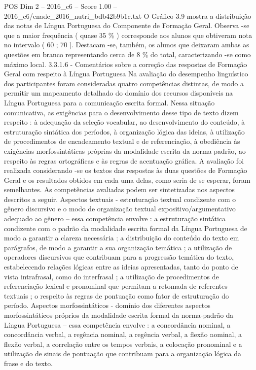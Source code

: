 \begin{textsample}{POS Dim 2 – 2016\_c6 – Score 1.00 – 2016\_c6/enade\_2016\_nutri\_bdb42b9b1c.txt}
O Gráfico 3.9 mostra a distribuição das notas de Língua Portuguesa do Componente de Formação Geral.
Observa -se que a maior frequência ( quase 35 \% ) corresponde aos alunos que obtiveram nota no intervalo ( 60 ; 70 ].
Destacam -se, também, os alunos que deixaram ambas as questões em branco representando cerca de 8 \% do total, caracterizando -se como máximo local. 3.3.1.6 - Comentários sobre a correção das respostas de Formação Geral com respeito à Língua Portuguesa Na avaliação do desempenho linguístico dos participantes foram consideradas quatro competências distintas, de modo a permitir um mapeamento detalhado do domínio dos recursos disponíveis na Língua Portuguesa para a comunicação escrita formal.
Nessa situação comunicativa, as exigências para o desenvolvimento desse tipo de texto dizem respeito : à adequação da seleção vocabular, ao desenvolvimento do conteúdo, à estruturação sintática dos períodos, à organização lógica das ideias, à utilização de procedimentos de encadeamento textual e de referenciação, à obediência às exigências morfossintáticas próprias da modalidade escrita da norma-padrão, ao respeito às regras ortográficas e às regras de acentuação gráfica.
A avaliação foi realizada considerando -se os textos das respostas às duas questões de Formação Geral e os resultados obtidos em cada uma delas, como seria de se esperar, foram semelhantes.
As competências avaliadas podem ser sintetizadas nos aspectos descritos a seguir.
Aspectos textuais - estruturação textual condizente com o gênero discursivo e o modo de organização textual expositivo/argumentativo adequado ao gênero – essa competência envolve : a estruturação sintática condizente com o padrão da modalidade escrita formal da Língua Portuguesa de modo a garantir a clareza necessária ; a distribuição do conteúdo do texto em parágrafos, de modo a garantir a sua organização temática ; a utilização de operadores discursivos que contribuam para a progressão temática do texto, estabelecendo relações lógicas entre as ideias apresentadas, tanto do ponto de vista intrafrasal, como do interfrasal ; a utilização de procedimentos de referenciação lexical e pronominal que permitam a retomada de referentes textuais ; o respeito às regras de pontuação como fator de estruturação do período.
Aspectos morfossintáticos - domínio dos diferentes aspectos morfossintáticos próprios da modalidade escrita formal da norma-padrão da Língua Portuguesa – essa competência envolve : a concordância nominal, a concordância verbal, a regência nominal, a regência verbal, a flexão nominal, a flexão verbal, a correlação entre os tempos verbais, a colocação pronominal e a utilização de sinais de pontuação que contribuam para a organização lógica da frase e do texto.

\end{textsample}
